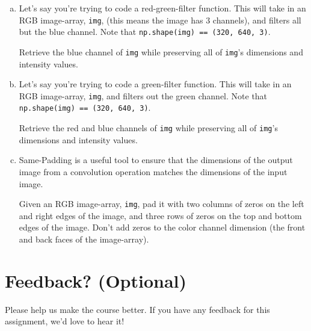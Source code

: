 \begin{enumerate}[(a)]
    \item Let's say you're trying to code a red-green-filter function. This will take in an RGB image-array, \texttt{img}, (this means the image has 3 channels), and filters all but the blue channel. Note that \texttt{np.shape(img) == (320, 640, 3)}.
    
    Retrieve the blue channel of \texttt{img} while preserving all of \texttt{img}'s dimensions and intensity values.
    
    
    \item Let's say you're trying to code a green-filter function. This will take in an RGB image-array, \texttt{img}, and filters out the green channel. Note that \texttt{np.shape(img) == (320, 640, 3)}. 
    
    Retrieve the red and blue channels of \texttt{img} while preserving all of \texttt{img}'s dimensions and intensity values.
    
    
    \item Same-Padding is a useful tool to ensure that the dimensions of the output image from a convolution operation matches the dimensions of the input image. 
    
    Given an RGB image-array, \texttt{img}, pad it with two columns of zeros on the left and right edges of the image, and three rows of zeros on the top and bottom edges of the image. Don't add zeros to the color channel dimension (the front and back faces of the image-array).
    
    
\end{enumerate}





\pagebreak
\section*{Feedback? (Optional)}
Please help us make the course better. If you have any feedback for this assignment, we'd love to hear it!


